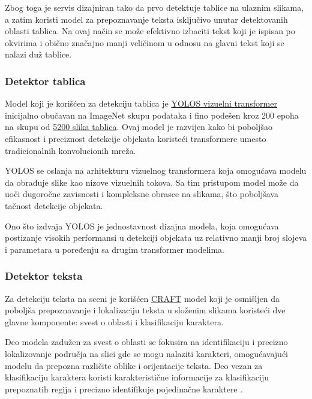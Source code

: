 \documentclass[a4paper,12pt]{article}
\begin{document}
	Zbog toga je servis dizajniran tako da prvo detektuje tablice na ulaznim slikama, a zatim koristi model za prepoznavanje teksta isključivo unutar detektovanih oblasti tablica. Na ovaj način se može efektivno izbaciti tekst koji je ispisan po okvirima i obično značajno manji veličinom u odnosu na glavni tekst koji se nalazi duž tablice.
	
	\subsubsection{Detektor tablica}
	Model koji je korišćen za detekciju tablica je \href{https://huggingface.co/nickmuchi/yolos-small-finetuned-license-plate-detection}{YOLOS vizuelni transformer} \cite{fang2021looksequencerethinkingtransformer} inicijalno obučavan na ImageNet skupu podataka i fino podešen kroz 200 epoha na skupu od \href{https://universe.roboflow.com/objectdetection-jhgr1/license-plates-recognition/dataset/2}{5200 slika tablica}. Ovaj model je razvijen kako bi poboljšao efikasnost i preciznost detekcije objekata koristeći transformere umesto tradicionalnih konvolucionih mreža.
	
	YOLOS se oslanja na arhitekturu vizuelnog transformera koja omogućava modelu da obrađuje slike kao nizove vizuelnih tokova. Sa tim pristupom model može da uoči dugoročne zavisnosti i kompleksne obrasce na slikama, što poboljšava tačnost detekcije objekata.
	
	Ono što izdvaja YOLOS je jednostavnost dizajna modela, koja omogućava postizanje visokih performansi u detekciji objekata uz relativno manji broj slojeva i parametara u poređenju sa drugim transformer modelima.
	
	\subsubsection{Detektor teksta}
	Za detekciju teksta na sceni je korišćen \href{https://github.com/clovaai/CRAFT-pytorch?tab=readme-ov-file}{CRAFT} model koji je osmišljen da poboljša prepoznavanje i lokalizaciju teksta u složenim slikama koristeći dve glavne komponente: svest o oblasti i klasifikaciju karaktera.
	
	Deo modela zadužen za svest o oblasti se fokusira na identifikaciju i precizno lokalizovanje područja na slici gde se mogu nalaziti karakteri, omogućavajući modelu da prepozna različite oblike i orijentacije teksta. Deo vezan za klasifikaciju karaktera koristi karakteristične informacije za klasifikaciju prepoznatih regija i precizno identifikuje pojedinačne karaktere \cite{baek2019characterregionawarenesstext}.
	
\end{document}
